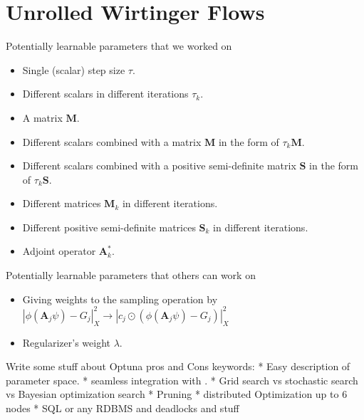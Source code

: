 \chapter{Unrolled Wirtinger Flows}




Potentially learnable parameters that we worked on\\
\begin{itemize}
  \item Single (scalar) step size $\tau$.
  \item Different scalars in different iterations $\tau_k$.
  \item A matrix $\boldsymbol{M}$.
  \item Different scalars combined with a matrix $\boldsymbol{M}$ in the form of $\tau_k \boldsymbol{M}$.
  \item Different scalars combined with a positive semi-definite matrix $\boldsymbol{S}$ in the form of $\tau_k \boldsymbol{S}$.
  \item Different matrices $\boldsymbol{M}_k$ in different iterations.
  \item Different positive semi-definite matrices $\boldsymbol{S}_k$ in different iterations.
  \item Adjoint operator $\boldsymbol{A}_k^*$.  
\end{itemize}

Potentially learnable parameters that others can work on\\
\begin{itemize}
  \item Giving weights to the sampling operation by $\left|\phi(\boldsymbol{A}_j\psi)-G_j\right|_X^2 \rightarrow \left|c_j \odot \left(\phi(\boldsymbol{A}_j\psi)-G_j\right)\right|_X^2$
  \item Regularizer's weight $\lambda$.
\end{itemize}



Write some stuff about Optuna pros and Cons
keywords:
* Easy description of parameter space.
* seamless integration with \pytorch. 
* Grid search vs stochastic search vs Bayesian optimization search
* Pruning 
* distributed Optimization up to 6 nodes
* \ac{SQL} or any \ac{RDBMS} and deadlocks and stuff